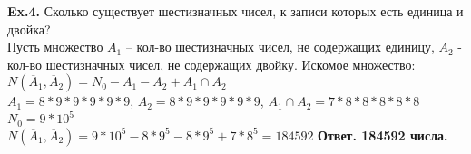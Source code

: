 \documentclass[a4paper,12pt]{article}
\begin{document}
\textbf{Ex.4.} Сколько существует шестизначных чисел, к записи которых
есть единица и двойка?
\\

Пусть множество $A_1$ -- кол-во шестизначных чисел, не содержащих единицу, $A_2$ - кол-во шестизначных чисел, не содержащих двойку. Искомое множество: $N(\overline A_1, \overline A_2) = N_0 - A_1 - A_2 + A_1 \cap A_2$
\\
$ A_1 = 8*9*9*9*9*9 $, $ A_2 = 8*9*9*9*9*9 $, $ A_1 \cap A_2 = 7*8*8*8*8*8$
\\
$ N_0 = 9*10^5 $
\\
$N(\overline A_1, \overline A_2) = 9*10^5 - 8*9^5 - 8*9^5 + 7*8^5 = 184592$
\textbf{Ответ. 184592 числа.}
\end{document}
